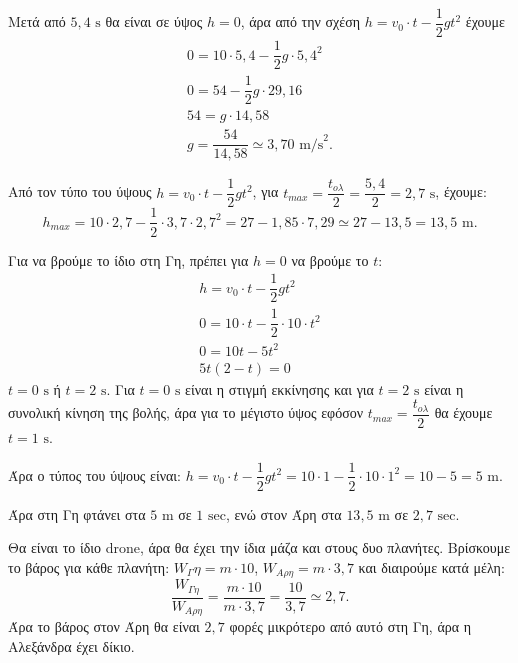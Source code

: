 
\begin{alist}
\item Μετά από $5,4\text{ s}$ θα είναι σε ύψος $h = 0$, άρα από την σχέση $h = v_0 \cdot t - \dfrac{1}{2}gt^2$ έχουμε
\begin{gather*}
0 = 10 \cdot 5,4 - \dfrac{1}{2}g \cdot 5,4^2 \\
0 = 54 - \dfrac{1}{2}g \cdot 29,16 \\
54 = g \cdot 14,58 \\
g = \dfrac{54}{14,58} \simeq 3,70\text{ m/s}^2.
\end{gather*}

\item Από τον τύπο του ύψους $h = v_0 \cdot t - \dfrac{1}{2}gt^2$, για $t_{max} = \dfrac{t_{o\lambda}}{2} = \dfrac{5,4}{2} = 2,7\text{ s}$, έχουμε:
\[h_{max} = 10 \cdot 2,7 - \dfrac{1}{2} \cdot 3,7 \cdot 2,7^2 = 27 - 1,85 \cdot 7,29 \simeq 27 - 13,5 = 13,5\text{ m}.\]

Για να βρούμε το ίδιο στη Γη, πρέπει για $h = 0$ να βρούμε το $t$:
\begin{gather*}
h = v_0 \cdot t - \dfrac{1}{2}gt^2 \\
0 = 10 \cdot t - \dfrac{1}{2} \cdot 10 \cdot t^2 \\
0 = 10t - 5t^2 \\
5t(2 - t) = 0
\end{gather*}
$t = 0\text{ s}$ ή $t = 2\text{ s}$.
Για $t = 0\text{ s}$ είναι η στιγμή εκκίνησης και για $t = 2\text{ s}$ είναι η συνολική κίνηση της βολής, άρα για το μέγιστο ύψος εφόσον $t_{max} = \dfrac{t_{o\lambda}}{2}$ θα έχουμε $t = 1\text{ s}$.

Άρα ο τύπος του ύψους είναι: $h = v_0 \cdot t - \dfrac{1}{2}gt^2 = 10 \cdot 1 - \dfrac{1}{2} \cdot 10 \cdot 1^2 = 10 - 5 = 5\text{ m}$.

Άρα στη Γη φτάνει στα $5\text{ m}$ σε $1\text{ sec}$, ενώ στον Άρη στα $13,5\text{ m}$ σε $2,7\text{ sec}$.

\item Θα είναι το ίδιο drone, άρα θα έχει την ίδια μάζα και στους δυο πλανήτες. Βρίσκουμε το βάρος για κάθε πλανήτη:
$W_\Gamma\eta = m \cdot 10$, $W_{A\rho\eta} = m \cdot 3,7$ και διαιρούμε κατά μέλη:
\[\dfrac{W_{\Gamma\eta}}{W_{A\rho\eta}} = \dfrac{m \cdot 10}{m \cdot 3,7} = \dfrac{10}{3,7} \simeq 2,7.\]
Άρα το βάρος στον Άρη θα είναι $2,7$ φορές μικρότερο από αυτό στη Γη, άρα η Αλεξάνδρα έχει δίκιο.
\end{alist}

